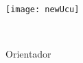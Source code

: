 \makeatletter
\begin{titlepage}
    \begin{center}
        \texttt{[image: newUcu]}

	\vspace*{3cm}

	{\Huge \textbf{\thetitle} \par}

	{\Large \@subtitle \par}

	\vspace*{1.0cm}

	{\LARGE \@course \par}

	\vspace*{3.5cm}

	{\LARGE \theauthor \par}

	\vspace*{1.0cm}

	{\LARGE \@supervisor\\
	{\large Orientador \par} \par}

        \vfill

	{\Large \@institute \par} \\
	{\Large \thedate \par}

    \end{center}
\end{titlepage}
\makeatother

